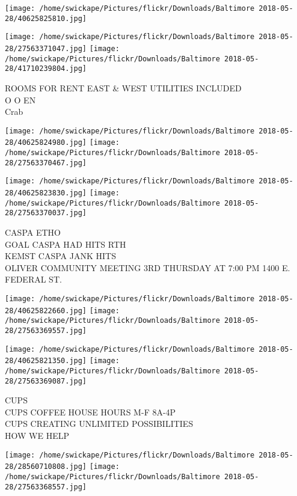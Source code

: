 \documentclass[10pt,letterpaper]{article}
\begin{document}
\texttt{[image: /home/swickape/Pictures/flickr/Downloads/Baltimore 2018-05-28/40625825810.jpg]}

\vspace{0.25in}
\texttt{[image: /home/swickape/Pictures/flickr/Downloads/Baltimore 2018-05-28/27563371047.jpg]}
\texttt{[image: /home/swickape/Pictures/flickr/Downloads/Baltimore 2018-05-28/41710239804.jpg]}

ROOMS FOR RENT EAST \& WEST UTILITIES INCLUDED\\
O O EN\\
Crab\\
\pagebreak

\texttt{[image: /home/swickape/Pictures/flickr/Downloads/Baltimore 2018-05-28/40625824980.jpg]}
\texttt{[image: /home/swickape/Pictures/flickr/Downloads/Baltimore 2018-05-28/27563370467.jpg]}

\texttt{[image: /home/swickape/Pictures/flickr/Downloads/Baltimore 2018-05-28/40625823830.jpg]}
\texttt{[image: /home/swickape/Pictures/flickr/Downloads/Baltimore 2018-05-28/27563370037.jpg]}

CASPA ETHO\\
GOAL CASPA HAD HITS RTH\\
KEMST CASPA JANK HITS\\
OLIVER COMMUNITY MEETING 3RD THURSDAY AT 7:00 PM 1400 E. FEDERAL ST.\\
\pagebreak

\texttt{[image: /home/swickape/Pictures/flickr/Downloads/Baltimore 2018-05-28/40625822660.jpg]}
\texttt{[image: /home/swickape/Pictures/flickr/Downloads/Baltimore 2018-05-28/27563369557.jpg]}

\texttt{[image: /home/swickape/Pictures/flickr/Downloads/Baltimore 2018-05-28/40625821350.jpg]}
\texttt{[image: /home/swickape/Pictures/flickr/Downloads/Baltimore 2018-05-28/27563369087.jpg]}

CUPS\\
CUPS COFFEE HOUSE HOURS M{-}F 8A{-}4P\\
CUPS CREATING UNLIMITED POSSIBILITIES\\
HOW WE HELP\\
\pagebreak

\texttt{[image: /home/swickape/Pictures/flickr/Downloads/Baltimore 2018-05-28/28560710808.jpg]}
\texttt{[image: /home/swickape/Pictures/flickr/Downloads/Baltimore 2018-05-28/27563368557.jpg]}
\end{document}
